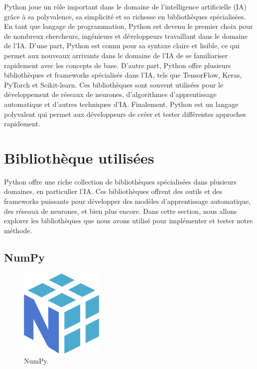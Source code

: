 Python joue un rôle important dans le domaine de l'intelligence artificielle (IA) grâce à sa polyvalence, sa simplicité et sa richesse en bibliothèques spécialisées. En tant que langage de programmation, Python est devenu le premier choix  pour de nombreux chercheurs, ingénieurs et développeurs travaillant dans le domaine de l'IA. D'une part, Python est connu pour sa syntaxe claire et lisible, ce qui  permet aux nouveaux arrivants dans le domaine de l'IA de se familiariser rapidement avec les concepts de base. D'autre part, Python offre plusieurs bibliothèques et frameworks spécialisés dans l'IA, tels que TensorFlow, Keras, PyTorch et Scikit-learn. Ces bibliothèques sont souvent utilisées pour le développement de réseaux de neurones, d'algorithmes d'apprentissage automatique et d'autres techniques d'IA. Finalement, Python est un langage polyvalent qui permet aux développeurs de créer et tester différentes approches rapidement.

\section{Bibliothèque utilisées}
Python offre une riche collection de bibliothèques spécialisées dans plusieurs domaines, en particulier l'IA. Ces bibliothèques offrent des outils et des frameworks puissants pour développer des modèles d'apprentissage automatique, des réseaux de neurones, et bien plus encore. Dans cette section, nous allons explorer les bibliothèques que nous avons utilisé pour implémenter et tester notre méthode.
\subsection{NumPy}

\begin{figure}[hbt!]
  \centering
  \includegraphics[width=4cm]{images_pfe/numpy.png}
  \caption{NumPy.}
  \label{fig:numpy}
\end{figure}
\FloatBarrier
\medskip

